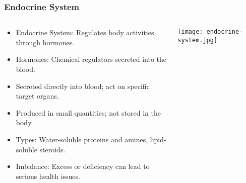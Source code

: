 \begin{frame}[fragile]\frametitle{Endocrine System}
\begin{columns}
    \begin{column}[T]{0.5\linewidth}
      \begin{itemize}
		\item Endocrine System: Regulates body activities through hormones.
		\item Hormones: Chemical regulators secreted into the blood.
		\item Secreted directly into blood; act on specific target organs.
		\item Produced in small quantities; not stored in the body.
		\item Types: Water-soluble proteins and amines, lipid-soluble steroids.
		\item Imbalance: Excess or deficiency can lead to serious health issues.
	  \end{itemize}
    \end{column}
    \begin{column}[T]{0.5\linewidth}
		\begin{center}
		\texttt{[image: endocrine-system.jpg]}
		\end{center}	
    \end{column}
  \end{columns}
\end{frame}

